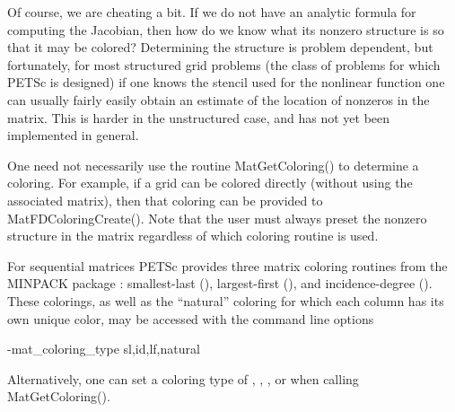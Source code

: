 Of course, we are cheating a bit. If we do not have an analytic
formula for computing the Jacobian, then how do we know what its
nonzero structure is so that it may be colored?  Determining the
structure is problem dependent, but fortunately, for most structured grid
problems (the class of problems for which PETSc is designed) if one
knows the stencil used for the nonlinear function one can usually
fairly easily obtain an estimate of the location of nonzeros in
the matrix. This is harder in the unstructured case, and has not yet
been implemented in general.

One need not necessarily use the routine MatGetColoring() to
determine a coloring.  For example, if a grid can be colored directly
(without using the associated matrix), then that coloring can be provided
to MatFDColoringCreate().  Note that the user must always
preset the nonzero structure in the matrix regardless of which
coloring routine is used.

For sequential matrices PETSc provides three matrix coloring routines from the 
MINPACK package \cite{more84}: smallest-last (), largest-first (),
and incidence-degree ().  These colorings, as well as the ``natural'' coloring 
for which each column has its own unique color, may be accessed with the command line options
\begin{tabbing}
   -mat\_coloring\_type \trl{<}sl,id,lf,natural\trl{>}
\end{tabbing}
Alternatively, one can set a coloring type of , , , or  
when calling MatGetColoring().   
 

